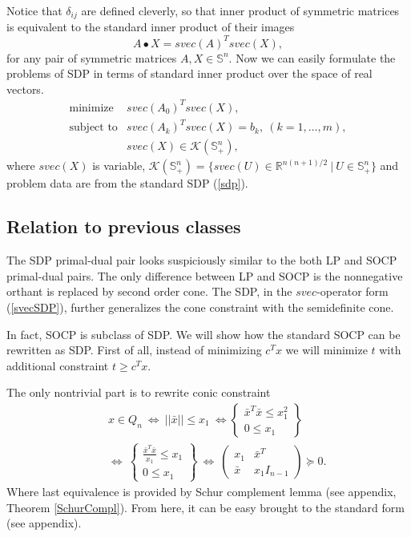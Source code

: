 \documentclass[12pt]{book}
\theoremstyle{definition}
\begin{document}
Notice that $\delta_{ij}$ are defined cleverly, so that inner product of symmetric matrices is equivalent to the standard inner product of their images
\begin{equation}
A\bullet X= svec(A)^Tsvec(X), 
\end{equation}
for any pair of symmetric matrices $A,X\in \mathbb{S}^n.$  Now we can easily formulate the problems of SDP in terms of standard inner product over the space of real vectors. 
\begin{equation}
\label{svecSDP}
\begin{array}{ll}
\mbox{minimize} & svec(A_0)^T svec(X),\\
\mbox{subject to}& svec(A_k)^T svec(X)  = b_k, \ (k = 1,\dots ,m), \\
& svec(X) \in \mathcal{K}(\mathbb{S}^n_+),
\end{array}
\end{equation}
where $svec(X)$ is variable,  $\mathcal{K}(\mathbb{S}^n_+) = \{svec(U)\in \mathbb{R}^{n(n+1)/2}\ |\ U\in \mathbb{S}^n_+\}$ 
and problem data are from the standard SDP (\ref{sdp}).


\subsection{Relation to previous classes}
The  SDP primal-dual pair looks suspiciously similar to the both LP and SOCP primal-dual pairs. 
The only difference between LP and SOCP is the nonnegative orthant is replaced by second order cone. 
The SDP, in the $svec$-operator form (\ref{svecSDP}), further generalizes the cone constraint with the semidefinite cone.

In fact, SOCP is subclass of SDP. We will show how the standard SOCP can be rewritten as SDP.
First of all, instead of minimizing $c^Tx$ we will minimize $t$ with additional constraint $t\geq c^Tx$. 

The only nontrivial part is to rewrite conic constraint 
\begin{eqnarray}
& &x\in Q_n \ \Leftrightarrow  \ ||\bar{x}||\leq x_1 \ \Leftrightarrow  
\left\lbrace \begin{array}{r}
\bar{x}^T\bar{x}\leq x_1^2\\
0\leq x_1 
\end{array}\right\rbrace \\
 & &\Leftrightarrow \ 
 \left\lbrace \begin{array}{r}
\frac{\bar{x}^T\bar{x}}{x_1}\leq x_1\\
0\leq x_1 
\end{array}\right\rbrace 
 \ \Leftrightarrow  \ 
 \left( \begin{array}{cc}
x_1 & \bar{x}^T\\
\bar{x} & x_1I_{n-1}
\end{array}\right)\succeq 0.
\label{arrowx}
\end{eqnarray}
Where last equivalence is provided by Schur complement lemma (see appendix, Theorem \ref{SchurCompl}).
From here, it can be easy brought to the standard form (see appendix). 
\end{document}
